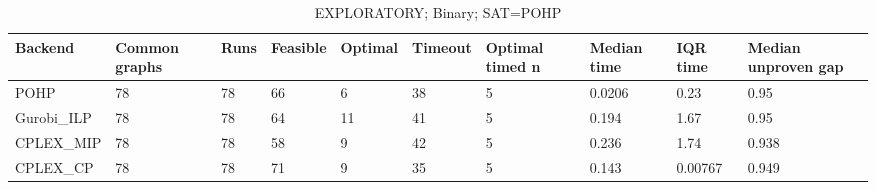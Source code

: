 \begin{table}[htbp]
\centering
\caption{EXPLORATORY; Binary; SAT=POHP}
\label{tab:p2b-Binary-exploratory-backends}
\begin{tabular}{llllllllll}
\hline
Backend & Common graphs & Runs & Feasible & Optimal & Timeout & Optimal timed n & Median time & IQR time & Median unproven gap \\
\hline
POHP & 78 & 78 & 66 & 6 & 38 & 5 & 0.0206 & 0.23 & 0.95 \\
Gurobi\_ILP & 78 & 78 & 64 & 11 & 41 & 5 & 0.194 & 1.67 & 0.95 \\
CPLEX\_MIP & 78 & 78 & 58 & 9 & 42 & 5 & 0.236 & 1.74 & 0.938 \\
CPLEX\_CP & 78 & 78 & 71 & 9 & 35 & 5 & 0.143 & 0.00767 & 0.949 \\
\hline
\end{tabular}
\end{table}
